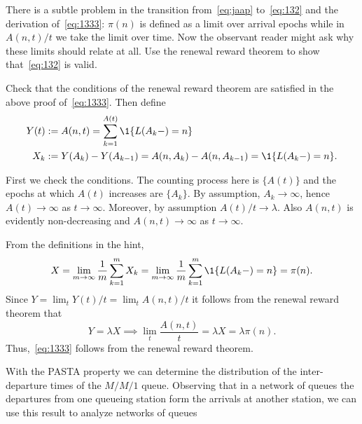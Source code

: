 \begin{exercise}\label{ex:18}
  There is a subtle problem in the transition from~\cref{eq:jaap} to~\cref{eq:132} and the derivation of~\cref{eq:1333}: $\pi(n)$ is defined as a limit over arrival epochs while in $A(n,t)/t$ we take the limit over time.
  Now the observant reader might ask why these limits should relate at all.
  Use the renewal reward theorem to show that~\cref{eq:132} is valid.
\begin{hint}
Check that the conditions of the renewal reward theorem are satisfied in the above proof of~\cref{eq:1333}. Then define  
\begin{align*}
  Y(t) &:= A(n,t) = \sum_{k=1}^{A(t)} \1{L(A_k-) = n} \\
X_k &:= Y(A_k) - Y(A_{k-1}) = A(n, A_k) - A(n, A_{k-1}) = \1{L(A_k-)=n}.
\end{align*}

\end{hint}
\begin{solution}
First we check the conditions.  The counting process here is $\{A(t)\}$ and the epochs at which
    $A(t)$ increases are $\{A_k\}$. By assumption, $A_k\to\infty$,
    hence $A(t)\to\infty$ as $t\to\infty$. Moreover, by assumption
    $A(t)/t \to \lambda$. Also $A(n,t)$ is evidently non-decreasing and
    $A(n,t)\to\infty$ as $t\to\infty$.


From the definitions in the hint,   
\begin{equation*}
X= \lim_{m\to\infty} \frac 1 m \sum_{k=1}^m X_k =\lim_{m\to\infty} \frac 1 m \sum_{k=1}^m \1{L(A_k-)=n} = \pi(n).
\end{equation*}
Since $Y=\lim_t Y(t)/t = \lim_t A(n,t)/t$ it follows from the renewal reward theorem that
\begin{equation*}
  Y=\lambda X \implies \lim_t \frac{A(n,t)} t = \lambda X = \lambda \pi(n).
\end{equation*}
Thus,~\cref{eq:1333} follows from the renewal reward theorem.
\end{solution}
\end{exercise}

With the PASTA property we can determine the distribution of the inter-departure times of the $M/M/1$ queue.
Observing that in a network of queues the departures from one queueing station form the arrivals at another station, we can use this result to analyze networks of queues

